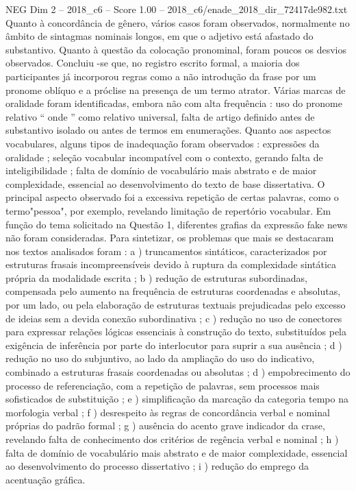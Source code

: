 \begin{textsample}{NEG Dim 2 – 2018\_c6 – Score 1.00 – 2018\_c6/enade\_2018\_dir\_72417de982.txt}
Quanto à concordância de gênero, vários casos foram observados, normalmente no âmbito de sintagmas nominais longos, em que o adjetivo está afastado do substantivo.
Quanto à questão da colocação pronominal, foram poucos os desvios observados.
Concluiu -se que, no registro escrito formal, a maioria dos participantes já incorporou regras como a não introdução da frase por um pronome oblíquo e a próclise na presença de um termo atrator.
Várias marcas de oralidade foram identificadas, embora não com alta frequência : uso do pronome relativo “ onde ” como relativo universal, falta de artigo definido antes de substantivo isolado ou antes de termos em enumerações.
Quanto aos aspectos vocabulares, alguns tipos de inadequação foram observados : expressões da oralidade ; seleção vocabular incompatível com o contexto, gerando falta de inteligibilidade ; falta de domínio de vocabulário mais abstrato e de maior complexidade, essencial ao desenvolvimento do texto de base dissertativa.
O principal aspecto observado foi a excessiva repetição de certas palavras, como o termo"pessoa", por exemplo, revelando limitação de repertório vocabular.
Em função do tema solicitado na Questão 1, diferentes grafias da expressão fake news não foram consideradas.
Para sintetizar, os problemas que mais se destacaram nos textos analisados foram : a ) truncamentos sintáticos, caracterizados por estruturas frasais incompreensíveis devido à ruptura da complexidade sintática própria da modalidade escrita ; b ) redução de estruturas subordinadas, compensada pelo aumento na frequência de estruturas coordenadas e absolutas, por um lado, ou pela elaboração de estruturas textuais prejudicadas pelo excesso de ideias sem a devida conexão subordinativa ; c ) redução no uso de conectores para expressar relações lógicas essenciais à construção do texto, substituídos pela exigência de inferência por parte do interlocutor para suprir a sua ausência ; d ) redução no uso do subjuntivo, ao lado da ampliação do uso do indicativo, combinado a estruturas frasais coordenadas ou absolutas ; d ) empobrecimento do processo de referenciação, com a repetição de palavras, sem processos mais sofisticados de substituição ; e ) simplificação da marcação da categoria tempo na morfologia verbal ; f ) desrespeito às regras de concordância verbal e nominal próprias do padrão formal ; g ) ausência do acento grave indicador da crase, revelando falta de conhecimento dos critérios de regência verbal e nominal ; h ) falta de domínio de vocabulário mais abstrato e de maior complexidade, essencial ao desenvolvimento do processo dissertativo ; i ) redução do emprego da acentuação gráfica.

\end{textsample}
